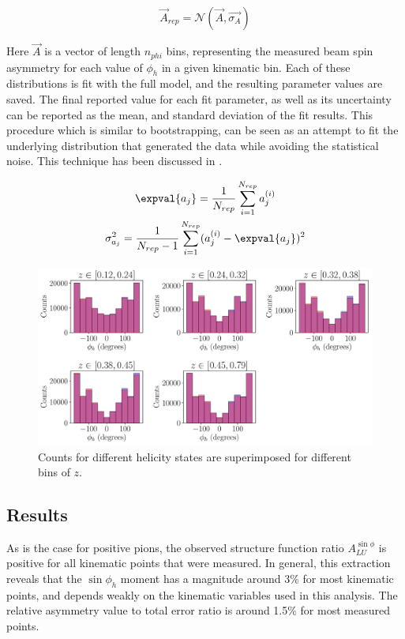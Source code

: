\begin{equation}
  \vec{A}_{rep} = \mathcal{N}(\vec{A}, \vec{\sigma_{A}})
\end{equation}

Here $\vec{A}$ is a vector of length $n_{phi}$ bins, representing the measured beam spin asymmetry for each value of $\phi_h$ in a given kinematic bin.  Each of these distributions is fit with the full model, and the resulting parameter values are saved.  The final reported value for each fit parameter, as well as its uncertainty can be reported as the mean, and standard deviation of the fit results.  This procedure which is similar to bootstrapping, can be seen as an attempt to fit the underlying distribution that generated the data while avoiding the statistical noise.  This technique has been discussed in \cite{computing-watt:2012}.

\begin{gather}
  \expval{a_j} = \frac{1}{N_{rep}} \sum_{i=1}^{N_{rep}} a_{j}^{(i)} \\
  \sigma_{a_j}^{2} = \frac{1}{N_{rep}-1} \sum_{i=1}^{N_{rep}} (a_{j}^{(i)} - \expval{a_j})^2 
\end{gather}

\begin{figure}
	\centering
	\includegraphics[width=16cm]{image/plots/kaon-bsa/z-phi-counts.pdf}
	\caption{Counts for different helicity states are superimposed for different bins of $z$.}
\end{figure}

\subsection{Results}
%
%
As is the case for positive pions, the observed structure function ratio $A_{LU}^{\sin\phi}$ is positive for all kinematic points that were measured.  In general, this extraction reveals that the $\sin\phi_h$ moment has a magnitude around 3\% for most kinematic points, and depends weakly on the kinematic variables used in this analysis.  The relative asymmetry value to total error ratio is around 1.5\% for most measured points.

